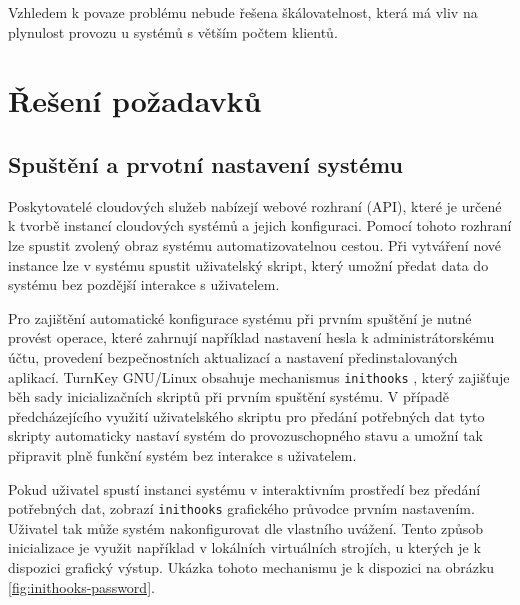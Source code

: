 Vzhledem k povaze problému nebude řešena škálovatelnost, která má vliv na plynulost provozu u systémů s větším počtem klientů.

\section{Řešení požadavků}

\subsection{Spuštění a prvotní nastavení systému}

Poskytovatelé cloudových služeb nabízejí webové rozhraní (API), které je určené k tvorbě instancí cloudových systémů a jejich konfiguraci.
Pomocí tohoto rozhraní lze spustit zvolený obraz systému automatizovatelnou cestou. Při vytváření nové instance lze v systému spustit uživatelský skript,
který umožní předat data do systému bez pozdější interakce s uživatelem.

Pro zajištění automatické konfigurace systému při prvním spuštění je nutné provést operace, které zahrnují například nastavení hesla k administrátorskému účtu,
provedení bezpečnostních aktualizací a nastavení předinstalovaných aplikací.
TurnKey GNU/Linux obsahuje mechanismus \texttt{inithooks} \cite{inithooks}, který zajišťuje běh sady inicializačních skriptů při prvním spuštění systému.
V případě předcházejícího využití uživatelského skriptu pro předání potřebných dat tyto skripty automaticky nastaví systém do provozuschopného stavu a umožní tak
připravit plně funkční systém bez interakce s uživatelem.

Pokud uživatel spustí instanci systému v interaktivním prostředí bez předání potřebných dat, zobrazí \texttt{inithooks} grafického průvodce prvním nastavením.
Uživatel tak může systém nakonfigurovat dle vlastního uvážení. Tento způsob inicializace je využit například v lokálních virtuálních strojích, u kterých je k dispozici
grafický výstup. Ukázka tohoto mechanismu je k dispozici na obrázku \ref{fig:inithooks-password}.

